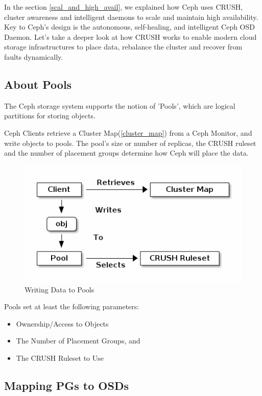 \documentclass[12pt,a4paper]{report}
\begin{document}
In the section \ref{scal_and_high_avail}, we explained how Ceph uses CRUSH,
cluster awareness and intelligent daemons to scale and maintain high
availability. Key to Ceph’s design is the autonomous, self-healing, and
intelligent Ceph OSD Daemon. Let’s take a deeper look at how CRUSH works to
enable modern cloud storage infrastructures to place data, rebalance the
cluster and recover from faults dynamically.

\subsection{About Pools}
The Ceph storage system supports the notion of 'Pools', which are logical
partitions for storing objects.

Ceph Clients retrieve a Cluster Map(\ref{cluster_map}) from a Ceph Monitor, and
write objects to pools. The pool's size or number of replicas, the CRUSH
ruleset and the number of placement groups determine how Ceph will place the
data.

\begin{figure}[h]
	\includegraphics[scale=0.75]{pool_usage.png}
	\caption{Writing Data to Pools}
	\label{fig:pool_usage}
\end{figure}

Pools set at least the following parameters:

\begin{itemize}
	\item Ownership/Access to Objects
	\item The Number of Placement Groups, and
	\item The CRUSH Ruleset to Use
\end{itemize}

\subsection{Mapping PGs to OSDs}
\end{document}
